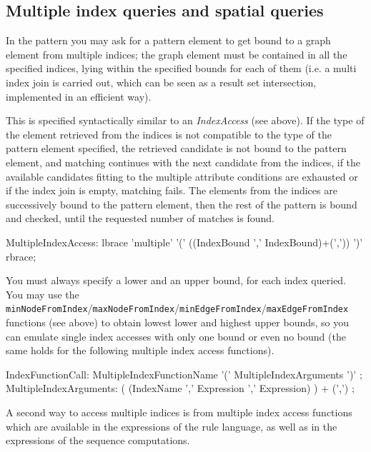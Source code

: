 \subsection*{Multiple index queries and spatial queries}\label{sub:indexusage}

In the pattern you may ask for a pattern element to get bound to a graph element from multiple indices;
the graph element must be contained in all the specified indices, lying within the specified bounds for each of them (i.e. a multi index join is carried out, which can be seen as a result set intersection, implemented in an efficient way).

This is specified syntactically similar to an \emph{IndexAccess} (see above).
If the type of the element retrieved from the indices is not compatible to the type of the pattern element specified, the retrieved candidate is not bound to the pattern element, and matching continues with the next candidate from the indices, if the available candidates fitting to the multiple attribute conditions are exhausted or if the index join is empty, matching fails.
The elements from the indices are successively bound to the pattern element, then the rest of the pattern is bound and checked, until the requested number of matches is found.


\begin{rail}
  MultipleIndexAccess:
    lbrace 'multiple' '(' ((IndexBound ',' IndexBound)+(',')) ')' rbrace;
\end{rail}

You must always specify a lower and an upper bound, for each index queried. You may use the \texttt{minNodeFromIndex}/\texttt{maxNodeFromIndex}/\texttt{minEdgeFromIndex}/\texttt{maxEdgeFromIndex} functions (see above) to obtain lowest lower and highest upper bounds, so you can emulate single index accesses with only one bound or even no bound (the same holds for the following multiple index access functions).

\begin{rail}
  IndexFunctionCall:
    MultipleIndexFunctionName '(' MultipleIndexArguments ')' ;
  MultipleIndexArguments: 
    ( (IndexName ',' Expression ',' Expression) ) + (',') ;
\end{rail}

\pagebreak

A second way to access multiple indices is from multiple index access functions which are available in the expressions of the rule language, as well as in the expressions of the sequence computations.

